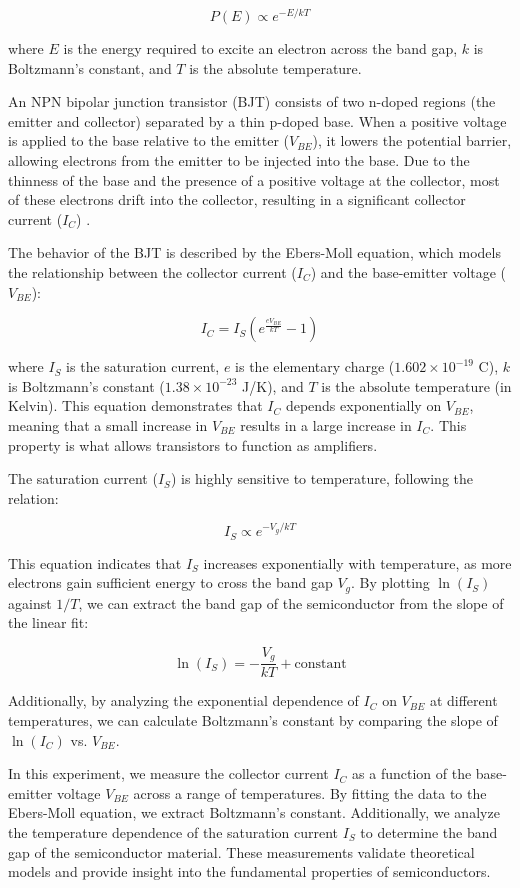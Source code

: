 \documentclass[12pt,letterpaper,onecolumn]{article}
\begin{document}
\[
P(E) \propto e^{-E/kT}
\]

where \( E \) is the energy required to excite an electron across the band gap, \( k \) is Boltzmann's constant, and \( T \) is the absolute temperature.

An NPN bipolar junction transistor (BJT) consists of two n-doped regions (the emitter and collector) separated by a thin p-doped base. When a positive voltage is applied to the base relative to the emitter (\( V_{BE} \)), it lowers the potential barrier, allowing electrons from the emitter to be injected into the base. Due to the thinness of the base and the presence of a positive voltage at the collector, most of these electrons drift into the collector, resulting in a significant collector current (\( I_C \)) \cite{Neudeck}.

The behavior of the BJT is described by the Ebers-Moll equation, which models the relationship between the collector current (\( I_C \)) and the base-emitter voltage (\( V_{BE} \)):

\[
I_C = I_S \left(e^{\frac{eV_{BE}}{kT}} - 1\right)
\]

where \( I_S \) is the saturation current, \( e \) is the elementary charge (\(1.602 \times 10^{-19}\) C), \( k \) is Boltzmann’s constant (\(1.38 \times 10^{-23}\) J/K), and \( T \) is the absolute temperature (in Kelvin). This equation demonstrates that \( I_C \) depends exponentially on \( V_{BE} \), meaning that a small increase in \( V_{BE} \) results in a large increase in \( I_C \). This property is what allows transistors to function as amplifiers.

The saturation current (\( I_S \)) is highly sensitive to temperature, following the relation:

\[
I_S \propto e^{-V_g/kT}
\]

This equation indicates that \( I_S \) increases exponentially with temperature, as more electrons gain sufficient energy to cross the band gap \( V_g \). By plotting \( \ln(I_S) \) against \( 1/T \), we can extract the band gap of the semiconductor from the slope of the linear fit:

\[
\ln(I_S) = -\frac{V_g}{kT} + \text{constant}
\]

Additionally, by analyzing the exponential dependence of \( I_C \) on \( V_{BE} \) at different temperatures, we can calculate Boltzmann’s constant by comparing the slope of \( \ln(I_C) \) vs. \( V_{BE} \).

In this experiment, we measure the collector current \( I_C \) as a function of the base-emitter voltage \( V_{BE} \) across a range of temperatures. By fitting the data to the Ebers-Moll equation, we extract Boltzmann’s constant. Additionally, we analyze the temperature dependence of the saturation current \( I_S \) to determine the band gap of the semiconductor material. These measurements validate theoretical models and provide insight into the fundamental properties of semiconductors.
\end{document}
